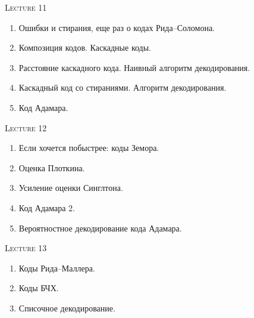 \centerline{\textsc{Lecture 11}}

\begin{enumerate}
    \item Ошибки и стирания, еще раз о кодах Рида--Соломона.
    \item Композиция кодов. Каскадные коды.
    \item Расстояние каскадного кода. Наивный алгоритм декодирования.
    \item Каскадный код со стираниями. Алгоритм декодирования.
    \item Код Адамара.
\end{enumerate}

\centerline{\textsc{Lecture 12}}

\begin{enumerate}
    \item Если хочется побыстрее: коды Земора.
    \item Оценка Плоткина.
    \item Усиление оценки Синглтона.
    \item Код Адамара 2.
    \item Вероятностное декодирование кода Адамара.
\end{enumerate}


\centerline{\textsc{Lecture 13}}

\begin{enumerate}
    \item Коды Рида--Маллера.
    \item Коды БЧХ.
    \item Списочное декодирование.
\end{enumerate}